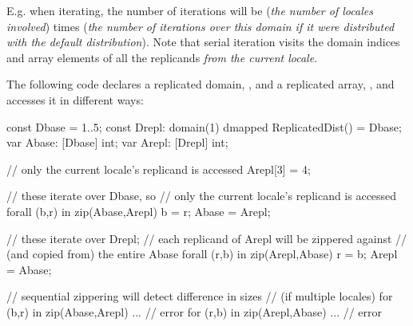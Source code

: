 E.g. when iterating, the number of iterations will be ({\it the number of
locales involved}) times ({\it the number of iterations over this domain if
it were distributed with the default distribution}). Note that serial iteration
visits the domain indices and array elements of all the replicands
\emph{from the current locale}.

%

\begin{example}
The following code declares a replicated domain, , and a
replicated array, , and accesses it in different ways:

\begin{chapel}
const Dbase = {1..5};
const Drepl: domain(1) dmapped ReplicatedDist() = Dbase;
var Abase: [Dbase] int;
var Arepl: [Drepl] int;

// only the current locale's replicand is accessed
Arepl[3] = 4;

// these iterate over Dbase, so
// only the current locale's replicand is accessed
forall (b,r) in zip(Abase,Arepl) b = r;
Abase = Arepl;

// these iterate over Drepl;
// each replicand of Arepl will be zippered against
// (and copied from) the entire Abase
forall (r,b) in zip(Arepl,Abase) r = b;
Arepl = Abase;

// sequential zippering will detect difference in sizes
// (if multiple locales)
for (b,r) in zip(Abase,Arepl) ... // error
for (r,b) in zip(Arepl,Abase) ... // error
\end{chapel}
\end{example}
